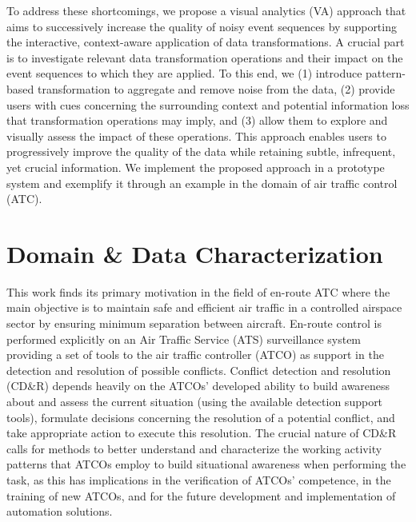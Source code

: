 \documentclass[camera]{vgtc}                          %
\begin{document}
To address these shortcomings, we propose a visual analytics (VA) approach that aims to successively increase the quality of noisy event sequences by supporting the interactive, context-aware application of data transformations.
A crucial part is to investigate relevant data transformation operations and their impact on the event sequences to which they are applied.
To this end, we (1) introduce pattern-based transformation to aggregate and remove noise from the data, (2) provide users with cues concerning the surrounding context and potential information loss that transformation operations may imply, and (3) allow them to explore and visually assess the impact of these operations.
This approach enables users to progressively improve the quality of the data while retaining subtle, infrequent, yet crucial information.   
We implement the proposed approach in a prototype system and exemplify it through an example in the domain of air traffic control (ATC).



\vspace{-4pt}
\section{Domain \& Data Characterization}
\label{sec:domain}
This work finds its primary motivation in the field of en-route ATC where the main objective is to maintain safe and efficient air traffic in a controlled airspace sector by ensuring minimum separation between aircraft. 
En-route control is performed explicitly on an Air Traffic Service (ATS) surveillance system providing a set of tools to the air traffic controller (ATCO) as support in the detection and resolution of possible conflicts. 
Conflict detection and resolution (CD\&R) depends heavily on the ATCOs' developed ability to build awareness about and assess the current situation (using the available detection support tools), formulate decisions concerning the resolution of a potential conflict, and take appropriate action to execute this resolution. 
The crucial nature of CD\&R calls for methods to better understand and characterize the working activity patterns that ATCOs employ to build situational awareness when performing the task, as this has implications in the verification of ATCOs' competence, in the training of new ATCOs, and for the future development and implementation of automation solutions. 
\end{document}
